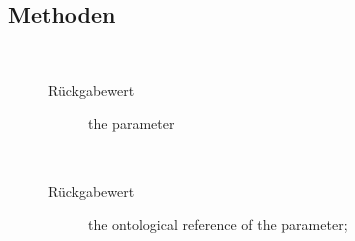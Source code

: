 \subsection{Methoden}
\begin{description}
\item[{\label{ontologyFramework.OFEventManagement.EventComputedData.getParameter()}}]
~ 
\begin{description}
\item[Rückgabewert] 
the parameter
\end{description}
\item[{\label{ontologyFramework.OFEventManagement.EventComputedData.getOntoRef()}}]
~ 
\begin{description}
\item[Rückgabewert] 
the ontological reference of the parameter;
\end{description}
\item[{\label{ontologyFramework.OFEventManagement.EventComputedData.toString()}}]
~ 
\end{description}
